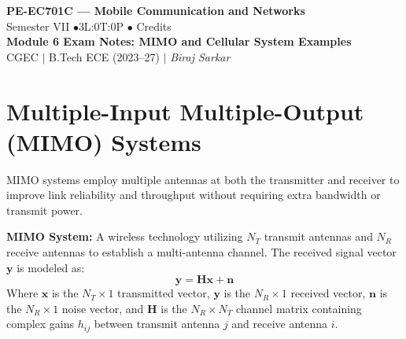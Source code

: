 \documentclass[12pt,a4paper]{article}
\begin{document}

\begin{center}
  {\LARGE\bfseries\color{myred} PE-EC701C --- Mobile Communication and Networks}\\[5pt]
  {\normalsize\color{mydark} Semester VII \quad$\bullet$\quad 3L:0T:0P \quad$\bullet$ Credits}\\[3pt]
  {\normalsize\color{myteal}\textbf{Module 6 Exam Notes: MIMO and Cellular System Examples}}\\[3pt]
  {\small\color{mydark} CGEC \;$|$\; B.Tech ECE (2023--27) \;$|$\; \textit{Biraj Sarkar}}
\end{center}
\noindent{\color{myred}\rule{\linewidth}{1.5pt}}
\vspace{2pt}

\hypersetup{linkcolor=mydark}
\tableofcontents
\hypersetup{linkcolor=myteal}
\newpage

\section{Multiple-Input Multiple-Output (MIMO) Systems}

MIMO systems employ multiple antennas at both the transmitter and receiver to improve link reliability and throughput without requiring extra bandwidth or transmit power.

\begin{tcolorbox}[defbox]
\textbf{MIMO System:} A wireless technology utilizing $N_T$ transmit antennas and $N_R$ receive antennas to establish a multi-antenna channel. The received signal vector $\mathbf{y}$ is modeled as:
\begin{equation}
  \mathbf{y} = \mathbf{H} \mathbf{x} + \mathbf{n}
\end{equation}
Where $\mathbf{x}$ is the $N_T \times 1$ transmitted vector, $\mathbf{y}$ is the $N_R \times 1$ received vector, $\mathbf{n}$ is the $N_R \times 1$ noise vector, and $\mathbf{H}$ is the $N_R \times N_T$ channel matrix containing complex gains $h_{ij}$ between transmit antenna $j$ and receive antenna $i$.
\end{tcolorbox}
\end{document}
